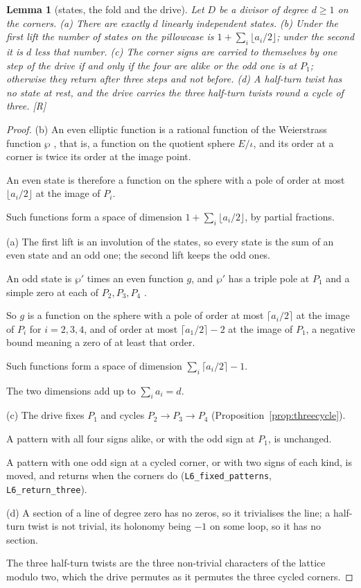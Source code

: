 \documentclass[11pt,a4paper]{article}
\theoremstyle{plain}
\newtheorem{lemma}[theorem]{Lemma}
\theoremstyle{definition}
\theoremstyle{remark}
\newcommand{\rigR}{[\textup{R}]}
\begin{document}
\begin{lemma}[states, the fold and the drive]\label{lem:states}
Let $D$ be a divisor of degree $d\geq1$ on the corners. (a) There are exactly $d$ linearly independent states. (b) Under the first lift the number of states on the pillowcase is $1+\sum_{i}\lfloor a_{i}/2\rfloor$; under the second it is $d$ less that number. (c) The corner signs are carried to themselves by one step of the drive if and only if the four are alike or the odd one is at $P_{1}$; otherwise they return after three steps and not before. (d) A half-turn twist has no state at rest, and the drive carries the three half-turn twists round a cycle of three. \rigR
\end{lemma}

\begin{proof}
(b) An even elliptic function is a rational function of the Weierstrass function $\wp$ \cite{WhittakerWatson}, that is, a function on the quotient sphere $E/\iota$, and its order at a corner is twice its order at the image point.

An even state is therefore a function on the sphere with a pole of order at most $\lfloor a_{i}/2\rfloor$ at the image of $P_{i}$.

Such functions form a space of dimension $1+\sum_{i}\lfloor a_{i}/2\rfloor$, by partial fractions.

(a) The first lift is an involution of the states, so every state is the sum of an even state and an odd one; the second lift keeps the odd ones.

An odd state is $\wp'$ times an even function $g$, and $\wp'$ has a triple pole at $P_{1}$ and a simple zero at each of $P_{2},P_{3},P_{4}$ \cite{WhittakerWatson}.

So $g$ is a function on the sphere with a pole of order at most $\lceil a_{i}/2\rceil$ at the image of $P_{i}$ for $i=2,3,4$, and of order at most $\lceil a_{1}/2\rceil-2$ at the image of $P_{1}$, a negative bound meaning a zero of at least that order.

Such functions form a space of dimension $\sum_{i}\lceil a_{i}/2\rceil-1$.

The two dimensions add up to $\sum_{i}a_{i}=d$.

(c) The drive fixes $P_{1}$ and cycles $P_{2}\to P_{3}\to P_{4}$ (Proposition~\ref{prop:threecycle}).

A pattern with all four signs alike, or with the odd sign at $P_{1}$, is unchanged.

A pattern with one odd sign at a cycled corner, or with two signs of each kind, is moved, and returns when the corners do (\texttt{L6\_fixed\_patterns}, \texttt{L6\_return\_three}).

(d) A section of a line of degree zero has no zeros, so it trivialises the line; a half-turn twist is not trivial, its holonomy being $-1$ on some loop, so it has no section.

The three half-turn twists are the three non-trivial characters of the lattice modulo two, which the drive permutes as it permutes the three cycled corners.
\end{proof}
\end{document}
